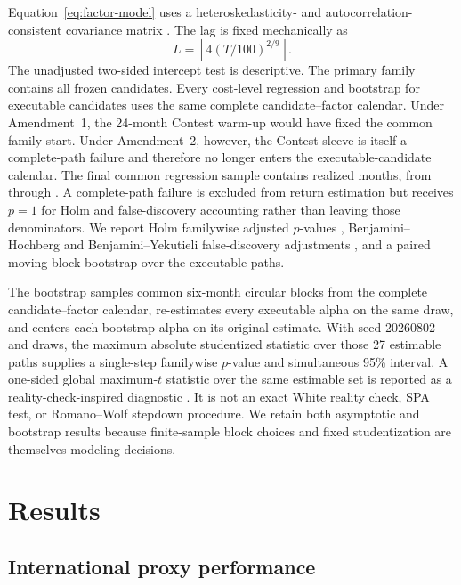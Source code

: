 \documentclass[11pt]{article}
\begin{document}
Equation~\eqref{eq:factor-model} uses a heteroskedasticity- and autocorrelation-consistent covariance matrix \citep{NeweyWest1987}. The lag is fixed mechanically as
\begin{equation}
 L=\left\lfloor 4\left(T/100\right)^{2/9}\right\rfloor.
\end{equation}
The unadjusted two-sided intercept test is descriptive. The primary family contains all \ProxyCount{} frozen candidates. Every cost-level regression and bootstrap for executable candidates uses the same complete candidate--factor calendar. Under Amendment~1, the 24-month Contest warm-up would have fixed the common family start. Under Amendment~2, however, the Contest sleeve is itself a complete-path failure and therefore no longer enters the executable-candidate calendar. The final common regression sample contains \RegressionMonthCount{} realized months, from \RegressionStartMonth{} through \RegressionEndMonth{}. A complete-path failure is excluded from return estimation but receives $p=1$ for Holm and false-discovery accounting rather than leaving those denominators. We report Holm familywise adjusted $p$-values \citep{Holm1979}, Benjamini--Hochberg and Benjamini--Yekutieli false-discovery adjustments \citep{BenjaminiHochberg1995,BenjaminiYekutieli2001}, and a paired moving-block bootstrap over the executable paths.

The bootstrap samples common six-month circular blocks from the complete candidate--factor calendar, re-estimates every executable alpha on the same draw, and centers each bootstrap alpha on its original estimate. With seed 20260802 and \BootstrapCount{} draws, the maximum absolute studentized statistic over those 27 estimable paths supplies a single-step familywise $p$-value and simultaneous 95\% interval. A one-sided global maximum-$t$ statistic over the same estimable set is reported as a reality-check-inspired diagnostic \citep{White2000RealityCheck,Hansen2005SPA,RomanoWolf2005DataSnooping}. It is not an exact White reality check, SPA test, or Romano--Wolf stepdown procedure. We retain both asymptotic and bootstrap results because finite-sample block choices and fixed studentization are themselves modeling decisions.

\section{Results}\label{sec:results}

\subsection{International proxy performance}
\end{document}

